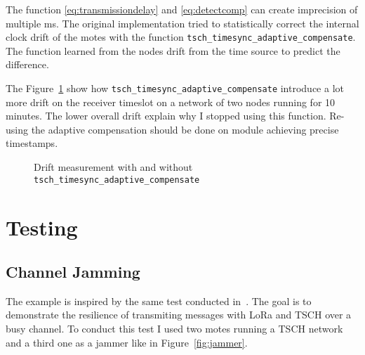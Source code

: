 The function \ref{eq:transmissiondelay} and \ref{eq:detectcomp} can
create imprecision of multiple ms.
The original implementation tried to statistically correct the internal clock
drift of the motes with the function
\lstinline{tsch_timesync_adaptive_compensate}.
The function learned from the nodes drift from the time source to predict the
difference.

The Figure~\ref{fig:driftmeasurement} show how
\lstinline{tsch_timesync_adaptive_compensate} introduce a lot more drift on the
receiver timeslot on a network of two nodes running for 10 minutes.
The lower overall drift explain why I stopped using this function.
Re-using the adaptive compensation should be done on module achieving precise
timestamps.

\begin{figure}[H]
  \centering
  \caption{Drift measurement with and without \lstinline{tsch_timesync_adaptive_compensate}\label{fig:driftmeasurement}}
\end{figure}

\section{Testing\label{section:tschtesting}}

\subsection{Channel Jamming}

The example is inspired by the same test conducted in~\cite{tschoverlora}.
The goal is to demonstrate the resilience of transmiting messages with LoRa and
TSCH over a busy channel.
To conduct this test I used two motes running a TSCH network and a third one
as a jammer like in Figure~\ref{fig:jammer}.

